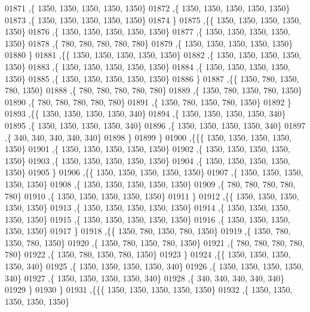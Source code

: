 \begin{DoxyCode}
01871    ,\{  1350,  1350,  1350,  1350,  1350\}
01872    ,\{  1350,  1350,  1350,  1350,  1350\}
01873    ,\{  1350,  1350,  1350,  1350,  1350\}
01874    \}
01875   ,\{\{  1350,  1350,  1350,  1350,  1350\}
01876    ,\{  1350,  1350,  1350,  1350,  1350\}
01877    ,\{  1350,  1350,  1350,  1350,  1350\}
01878    ,\{   780,   780,   780,   780,   780\}
01879    ,\{  1350,  1350,  1350,  1350,  1350\}
01880    \}
01881   ,\{\{  1350,  1350,  1350,  1350,  1350\}
01882    ,\{  1350,  1350,  1350,  1350,  1350\}
01883    ,\{  1350,  1350,  1350,  1350,  1350\}
01884    ,\{  1350,  1350,  1350,  1350,  1350\}
01885    ,\{  1350,  1350,  1350,  1350,  1350\}
01886    \}
01887   ,\{\{  1350,   780,  1350,   780,  1350\}
01888    ,\{   780,   780,   780,   780,   780\}
01889    ,\{  1350,   780,  1350,   780,  1350\}
01890    ,\{   780,   780,   780,   780,   780\}
01891    ,\{  1350,   780,  1350,   780,  1350\}
01892    \}
01893   ,\{\{  1350,  1350,  1350,  1350,   340\}
01894    ,\{  1350,  1350,  1350,  1350,   340\}
01895    ,\{  1350,  1350,  1350,  1350,   340\}
01896    ,\{  1350,  1350,  1350,  1350,   340\}
01897    ,\{   340,   340,   340,   340,   340\}
01898    \}
01899   \}
01900  ,\{\{\{  1350,  1350,  1350,  1350,  1350\}
01901    ,\{  1350,  1350,  1350,  1350,  1350\}
01902    ,\{  1350,  1350,  1350,  1350,  1350\}
01903    ,\{  1350,  1350,  1350,  1350,  1350\}
01904    ,\{  1350,  1350,  1350,  1350,  1350\}
01905    \}
01906   ,\{\{  1350,  1350,  1350,  1350,  1350\}
01907    ,\{  1350,  1350,  1350,  1350,  1350\}
01908    ,\{  1350,  1350,  1350,  1350,  1350\}
01909    ,\{   780,   780,   780,   780,   780\}
01910    ,\{  1350,  1350,  1350,  1350,  1350\}
01911    \}
01912   ,\{\{  1350,  1350,  1350,  1350,  1350\}
01913    ,\{  1350,  1350,  1350,  1350,  1350\}
01914    ,\{  1350,  1350,  1350,  1350,  1350\}
01915    ,\{  1350,  1350,  1350,  1350,  1350\}
01916    ,\{  1350,  1350,  1350,  1350,  1350\}
01917    \}
01918   ,\{\{  1350,   780,  1350,   780,  1350\}
01919    ,\{  1350,   780,  1350,   780,  1350\}
01920    ,\{  1350,   780,  1350,   780,  1350\}
01921    ,\{   780,   780,   780,   780,   780\}
01922    ,\{  1350,   780,  1350,   780,  1350\}
01923    \}
01924   ,\{\{  1350,  1350,  1350,  1350,   340\}
01925    ,\{  1350,  1350,  1350,  1350,   340\}
01926    ,\{  1350,  1350,  1350,  1350,   340\}
01927    ,\{  1350,  1350,  1350,  1350,   340\}
01928    ,\{   340,   340,   340,   340,   340\}
01929    \}
01930   \}
01931  ,\{\{\{  1350,  1350,  1350,  1350,  1350\}
01932    ,\{  1350,  1350,  1350,  1350,  1350\}

\end{DoxyCode}
